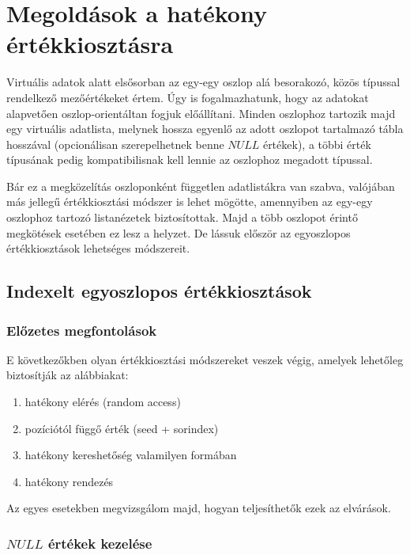 \documentclass[
    parspace, %
    noindent, %
]{elteiktdk}[2023/04/10]
\begin{document}

\section{Megoldások a hatékony értékkiosztásra}

Virtuális adatok alatt elsősorban az egy-egy oszlop alá besorakozó,
közös típussal rendelkező mezőértékeket értem.
Úgy is fogalmazhatunk, hogy az adatokat alapvetően oszlop-orientáltan fogjuk előállítani.
Minden oszlophoz tartozik majd egy virtuális adatlista,
melynek hossza egyenlő az adott oszlopot tartalmazó tábla hosszával
(opcionálisan szerepelhetnek benne $NULL$ értékek),
a többi érték típusának pedig kompatibilisnak kell lennie az oszlophoz megadott típussal.

Bár ez a megközelítás oszloponként független adatlistákra van szabva,
valójában más jellegű értékkiosztási módszer is lehet mögötte,
amennyiben az egy-egy oszlophoz tartozó listanézetek biztosítottak.
Majd a több oszlopot érintő megkötések esetében ez lesz a helyzet.
De lássuk először az egyoszlopos értékkiosztások lehetséges módszereit.

\subsection{Indexelt egyoszlopos értékkiosztások}

\subsubsection{Előzetes megfontolások}

E következőkben olyan értékkiosztási módszereket veszek végig,
amelyek lehetőleg biztosítják az alábbiakat:

\begin{enumerate}
  \item hatékony elérés (random access)
  \item pozíciótól függő érték (seed + sorindex)
  \item hatékony kereshetőség valamilyen formában
  \item hatékony rendezés
\end{enumerate}

Az egyes esetekben megvizsgálom majd, hogyan teljesíthetők ezek az elvárások.

\subsubsection{$NULL$ értékek kezelése}
\end{document}
